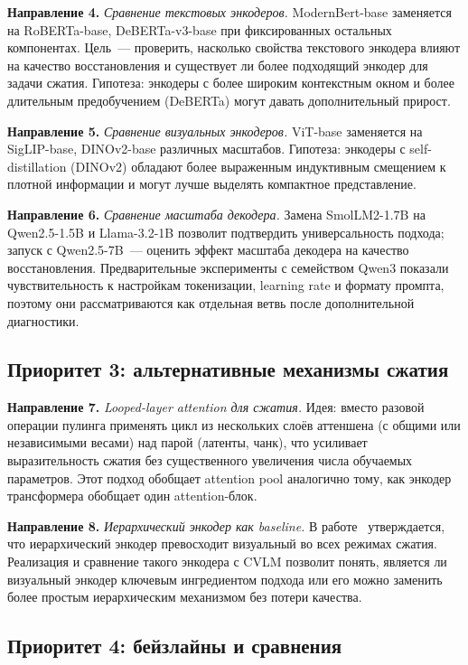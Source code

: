 \documentclass[a4paper,12pt]{extarticle}
\begin{document}
\textbf{Направление 4.} \emph{Сравнение текстовых энкодеров.}
ModernBert-base заменяется на RoBERTa-base, DeBERTa-v3-base при фиксированных остальных компонентах. Цель~--- проверить, насколько свойства текстового энкодера влияют на качество восстановления и существует ли более подходящий энкодер для задачи сжатия. Гипотеза: энкодеры с более широким контекстным окном и более длительным предобучением (DeBERTa) могут давать дополнительный прирост.

\textbf{Направление 5.} \emph{Сравнение визуальных энкодеров.}
ViT-base заменяется на SigLIP-base, DINOv2-base различных масштабов. Гипотеза: энкодеры с self-distillation (DINOv2) обладают более выраженным индуктивным смещением к плотной информации и могут лучше выделять компактное представление.

\textbf{Направление 6.} \emph{Сравнение масштаба декодера.}
Замена SmolLM2-1.7B на Qwen2.5-1.5B и Llama-3.2-1B позволит подтвердить универсальность подхода; запуск с Qwen2.5-7B~--- оценить эффект масштаба декодера на качество восстановления. Предварительные эксперименты с семейством Qwen3 показали чувствительность к настройкам токенизации, learning rate и формату промпта, поэтому они рассматриваются как отдельная ветвь после дополнительной диагностики.

\subsection{Приоритет 3: альтернативные механизмы сжатия}

\textbf{Направление 7.} \emph{Looped-layer attention для сжатия.}
Идея: вместо разовой операции пулинга применять цикл из нескольких слоёв аттеншена (с общими или независимыми весами) над парой (латенты, чанк), что усиливает выразительность сжатия без существенного увеличения числа обучаемых параметров. Этот подход обобщает attention pool аналогично тому, как энкодер трансформера обобщает один attention-блок.

\textbf{Направление 8.} \emph{Иерархический энкодер как baseline.}
В работе~\cite{bad_ocr} утверждается, что иерархический энкодер превосходит визуальный во всех режимах сжатия. Реализация и сравнение такого энкодера с CVLM позволит понять, является ли визуальный энкодер ключевым ингредиентом подхода или его можно заменить более простым иерархическим механизмом без потери качества.

\subsection{Приоритет 4: бейзлайны и сравнения}
\end{document}
